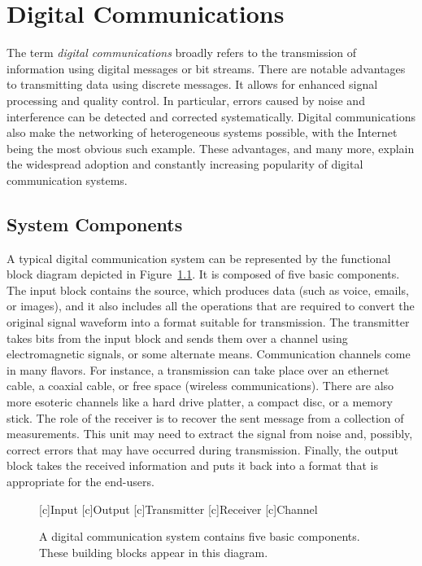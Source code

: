 \chapter{Digital Communications}

The term \emph{digital communications} broadly refers to the transmission of information using digital messages or bit streams.
There are notable advantages to transmitting data  using discrete messages.
It allows for enhanced signal processing and quality control.
In particular, errors caused by noise and interference can be detected and corrected systematically.
Digital communications also make the networking of heterogeneous systems possible, with the Internet being the most obvious such example.
These advantages, and many more, explain the widespread adoption and constantly increasing popularity of digital communication systems.


\section{System Components}

A typical digital communication system can be represented by the functional block diagram depicted in Figure~\ref{figure:BlockDiagram}.
It is composed of five basic components.
The input block contains the source, which produces data (such as voice, emails, or images), and it also includes all the operations that are required to convert the original signal waveform into a format suitable for transmission.
The transmitter takes bits from the input block and sends them over a channel using electromagnetic signals, or some alternate means.
Communication channels come in many flavors.
For instance, a transmission can take place over an ethernet cable, a coaxial cable, or free space (wireless communications).
There are also more esoteric channels like a hard drive platter, a compact disc, or a memory stick.
The role of the receiver is to recover the sent message from a collection of measurements.
This unit may need to extract the signal from noise and, possibly, correct errors that may have occurred during transmission.
Finally, the output block takes the received information and puts it back into a format that is appropriate for the end-users.

\begin{figure}[htbp]
\begin{center}
\begin{psfrags}
[c]{Input}
[c]{Output}
[c]{Transmitter}
[c]{Receiver}
[c]{Channel}
\end{psfrags}
\end{center}
\caption{A digital communication system contains five basic components.
These building blocks appear in this diagram.}
\label{figure:BlockDiagram}
\end{figure}

